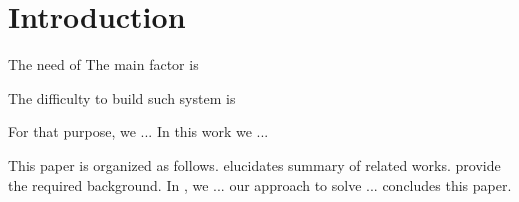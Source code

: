 \section{Introduction} \label{sec:Introduction}

The need of
The main factor is

The difficulty to build such system is 





For that purpose,
	we ...
In this work we ...

This paper is organized as follows.
 elucidates summary of related works.
 provide the required background.
In ,
	we ... our approach to solve ...
 concludes this paper.



